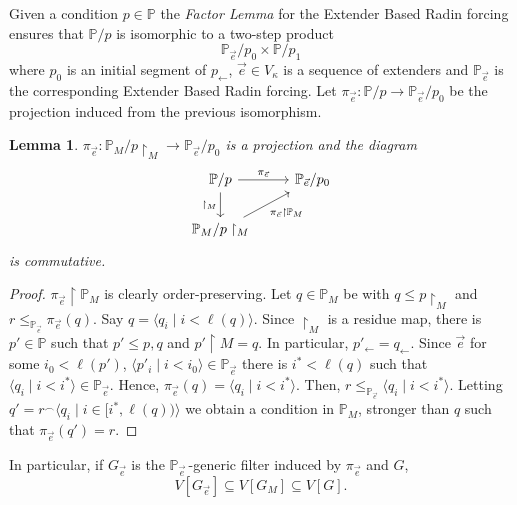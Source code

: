 \documentclass[11pt]{amsart}
\newtheorem{lemma}[theorem]{Lemma}
\theoremstyle{definition}
\theoremstyle{remark}
\def\s{\subseteq}
\newcommand\ale[1]{\marginpar{Alejandro: #1}}
\begin{document}
Given a condition $p\in \mathbb{P}$ the \emph{Factor Lemma} for the Extender Based Radin forcing \cite[p. 461]{Merimovich} ensures that $\mathbb{P}/p$ is isomorphic to a two-step product
$$\mathbb{P}_{\vec e}/p_0\times \mathbb{P}/p_1$$
where $p_0$ is an initial segment of $p_{\leftarrow}$, $\vec{e}\in V_\kappa$ is a  sequence of extenders and $\mathbb{P}_{\vec e}$ is the corresponding Extender Based Radin forcing.  Let $\pi_{\vec{e}}\colon \mathbb{P}/p\to \mathbb{P}_{\vec e}/p_0$ be the projection induced from the previous isomorphism.  
\begin{lemma}
     $\pi_{\vec{e}}\colon \mathbb{P}_M/p\restriction_M \to \mathbb{P}_{\vec{e}}/p_0$ is a projection and the diagram 
$$
\begin{tikzcd}
    \mathbb{P}/p \arrow[r, "{\pi_{\vec{e}}}"] \arrow[d, "\restriction_M"'] 
     & \mathbb{P}_{\vec{e}}/p_0  \\
\mathbb{P}_M/p\restriction_M \arrow[ru, "{\pi_{\vec{e}}\restriction \mathbb{P}_M}" '] &  
\end{tikzcd}
$$
is commutative.
\end{lemma}
\begin{proof}
$\pi_{\vec e}\restriction \mathbb{P}_M$ is clearly order-preserving. Let $q\in \mathbb{P}_M$ be with  $q\leq p\restriction_M$ and $r\leq_{\mathbb{P}_{\vec e}} \pi_{\vec{e}}(q)$. Say $q=\langle q_i\mid i<\ell(q)\rangle$. Since $\restriction_M$ is a residue map, there is $p'\in \mathbb{P}$ such that $p'\leq p, q$ and $p'\restriction M=q$. In particular, $p'_{\leftarrow}=q_{\leftarrow}$. Since $\vec{e}$ for some $i_0<\ell(p')$, $\langle p'_i\mid i<i_0\rangle\in \mathbb{P}_{\vec e}$ there is  $i^*<\ell(q)$ such that  $\langle q_i\mid i<i^*\rangle \in \mathbb{P}_{\vec{e}}$. Hence, $\pi_{\vec{e}}(q)=\langle q_i\mid i<i^*\rangle$. Then, $r\leq_{\mathbb{P}_{\vec{e}}} \langle q_i\mid i<i^*\rangle$. Letting $q'=r{}^\smallfrown \langle q_i\mid i\in [i^*,\ell(q))\rangle$ we obtain a condition in $\mathbb{P}_M$, stronger than $q$ such that $\pi_{\vec{e}}(q')=r$.
\end{proof}

In particular, if $G_{\vec e}$ is the $\mathbb{P}_{\vec e}\,$-generic filter induced by $\pi_{\vec e}$ and $G$, 
\begin{equation}\label{eq: inclusion between models}
\tag{*}  V[G_{\vec e}]\s V[G_M]\s V[G].  
\end{equation}
\end{document}
